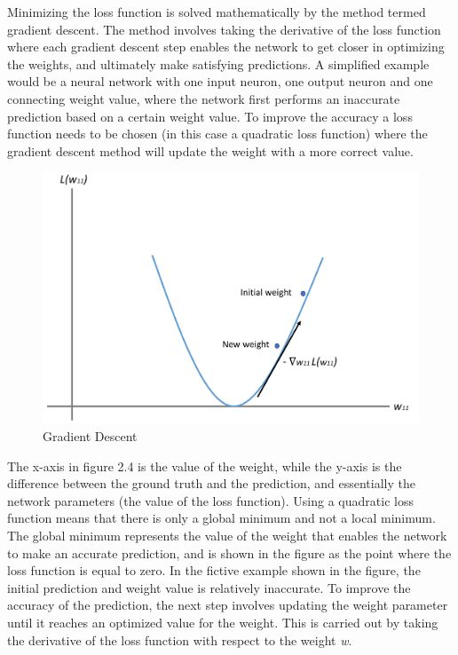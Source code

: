 \indent\newline 
Minimizing the loss function is solved mathematically by the method termed gradient descent. The method involves taking the derivative of the loss function where each gradient descent step enables the network to get closer in optimizing the weights, and ultimately make satisfying predictions. A simplified example would be a neural network with one input neuron, one output neuron and one connecting weight value, where the network first performs an inaccurate prediction based on a certain weight value. To improve the accuracy a loss function needs to be chosen (in this case a quadratic loss function) where the gradient descent method will update the weight with a more correct value. 

\indent\newline 
\begin{figure}[H]
\centering
\includegraphics [scale=0.40,angle=360]{figures/gradient.png}
\caption{Gradient Descent}
\label{fig:gradient}
\end{figure}

\indent\newline 
The x-axis in figure 2.4 is the value of the weight, while the y-axis is the difference between the ground truth and the prediction, and essentially the network parameters (the value of the loss function). Using a quadratic loss function means that there is only a global minimum and not a local minimum. The global minimum represents the value of the weight that enables the network to make an accurate prediction, and is shown in the figure as the point where the loss function is equal to zero. In the fictive example shown in the figure, the initial prediction and weight value is relatively inaccurate. To improve the accuracy of the prediction, the next step involves updating the weight parameter until it reaches an optimized value for the weight. This is carried out by taking the derivative of the loss function with respect to the weight \textit{w}.

